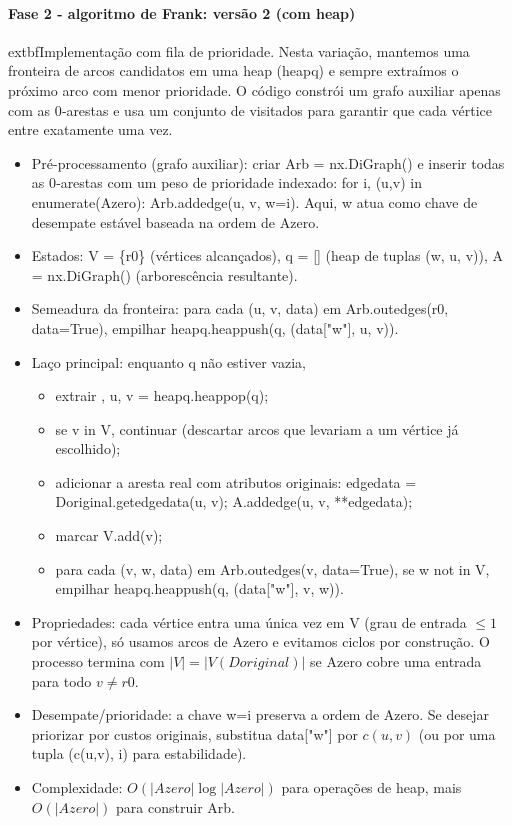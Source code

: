 \documentclass[12pt,a4paper]{article}
\def\texttt#1{#1}%
\def\emph#1{#1}%
\def\_{}%
\begin{document}
\paragraph{Fase 2 - algoritmo de Frank: versão 2 (com heap)}
	extbf{Implementação com fila de prioridade.} Nesta variação, mantemos uma \emph{fronteira} de arcos candidatos em uma heap (\texttt{heapq}) e sempre extraímos o próximo arco com menor prioridade. O código constrói um grafo auxiliar apenas com as 0‑arestas e usa um conjunto de visitados para garantir que cada vértice entre exatamente uma vez.
\begin{itemize}\setlength{\itemsep}{1pt}
    \item \emph{Pré-processamento (grafo auxiliar):} criar \texttt{Arb = nx.DiGraph()} e inserir todas as 0‑arestas com um peso de prioridade indexado: \texttt{for i, (u,v) in enumerate(A\_zero): Arb.add\_edge(u, v, w=i)}. Aqui, \texttt{w} atua como \emph{chave de desempate} estável baseada na ordem de \texttt{A\_zero}.
    \item \emph{Estados:} \texttt{V = \{r0\}} (vértices alcançados), \texttt{q = []} (heap de tuplas \texttt{(w, u, v)}), \texttt{A = nx.DiGraph()} (arborescência resultante).
    \item \emph{Semeadura da fronteira:} para cada \texttt{(u, v, data)} em \texttt{Arb.out\_edges(r0, data=True)}, empilhar \texttt{heapq.heappush(q, (data["w"], u, v))}.
    \item \emph{Laço principal:} enquanto \texttt{q} não estiver vazia,
    \begin{itemize}\setlength{\itemsep}{1pt}
        \item extrair \texttt{\_, u, v = heapq.heappop(q)};
        \item se \texttt{v in V}, continuar (descartar arcos que levariam a um vértice já escolhido);
        \item adicionar a aresta real com atributos originais: \texttt{edge\_data = D\_original.get\_edge\_data(u, v); A.add\_edge(u, v, **edge\_data)};
        \item marcar \texttt{V.add(v)};
        \item para cada \texttt{(v, w, data)} em \texttt{Arb.out\_edges(v, data=True)}, se \texttt{w not in V}, empilhar \texttt{heapq.heappush(q, (data["w"], v, w))}.
    \end{itemize}
    \item \emph{Propriedades:} cada vértice entra uma única vez em \texttt{V} (grau de entrada \(\le 1\) por vértice), só usamos arcos de \texttt{A\_zero} e evitamos ciclos por construção. O processo termina com \(|V| = |V(D\_original)|\) se \texttt{A\_zero} cobre uma entrada para todo \(v\neq r0\).
    \item \emph{Desempate/prioridade:} a chave \texttt{w=i} preserva a ordem de \texttt{A\_zero}. Se desejar priorizar por custos originais, substitua \texttt{data["w"]} por \(c(u,v)\) (ou por uma tupla \texttt{(c(u,v), i)} para estabilidade).
    \item \emph{Complexidade:} \(O(|A\_zero| \log |A\_zero|)\) para operações de heap, mais \(O(|A\_zero|)\) para construir \texttt{Arb}.
\end{itemize}
\end{document}
